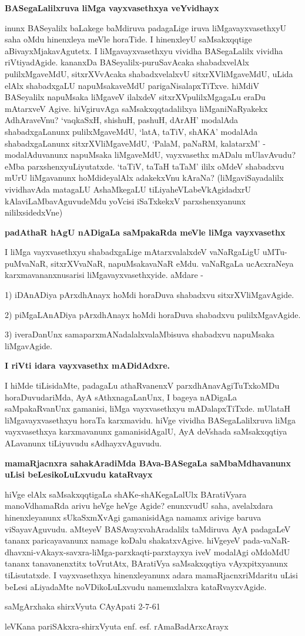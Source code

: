 \noindent
\textbf{BASegaLalilxruva liMga vayxvasethxya veYvidhayx}\label{page17}

inunx BASeyalilx baLakege baMdiruva padagaLige iruva liMgavayxvasethxyU saha oMdu hinenxleya meVle horaTide. I hinenxleyU saMsakxqqtige aBivayxMjakavAgutetx. I liMgavayxvasethxyu vividha BASegaLalilx vividha riVtiyadAgide. kananxDa BASeyalilx-puruSavAcaka shabadxvelAlx pulilxMgaveMdU, sitxrXVvAcaka shabadxvelalxvU sitxrXVliMgaveMdU, uLida elAlx shabadxgaLU napuMsakaveMdU parigaNisalapxTiTxve. hiMdiV BASeyalilx napuMsaka liMgaveV ilalxdeV sitxrXVpulilxMgagaLu eraDu mAtarxveV Agive. hiVgiruvAga saMsakxqqtadalilxya liMganiNaRyakekx AdhAraveVnu? `vaqkaSxH, shishuH, pashuH, dArAH' modalAda shabadxgaLanunx pulilxMgaveMdU, `latA, taTiV, shAKA' modalAda shabadxgaLanunx sitxrXVliMgaveMdU, `PalaM, paNaRM, kalatarxM' - modalAduvanunx napuMsaka liMgaveMdU, vayxvasethx mADalu mUlavAvudu? eMba parxshenxyuLiyutatxde. `taTiV, taTaH taTaM' ililx oMdeV shabadxvu mUrU liMgavanunx hoMdideyalAlx adakekxVnu kAraNa? (liMgaviSayadalilx vividhavAda matagaLU AshaMkegaLU tiLiyaheVLabeVkAgidadxrU kAlaviLaMbavAguvudeMdu yoVcisi iSaTxkekxV parxshenxyanunx nililxsidedxVne)

\noindent
\textbf{padAthaR hAgU nADigaLa saMpakaRda meVle liMga vayxvasethx}\label{page18}

I liMga vayxvasethxyu shabadxgaLige mAtarxvalalxdeV vaNaRgaLigU uMTu-puMvaNaR, sitxrXVvaNaR, napuMsakavaNaR eMdu. vaNaRgaLa ucAcxraNeya karxmavananxnusarisi liMgavayxvasethxyide. aMdare -

1) iDAnADiya pArxdhAnayx hoMdi horaDuva shabadxvu sitxrXVliMgavAgide.

2) piMgaLAnADiya pArxdhAnayx hoMdi horaDuva shabadxvu pulilxMgavAgide.

3) iveraDanUnx samaparxmANadalalxvalaMbisuva shabadxvu napuMsaka liMgavAgide.

\noindent
\textbf{I riVti idara vayxvasethx mADidAdxre.}

I hiMde tiLisidaMte, padagaLu athaRvanenxV parxdhAnavAgiTuTxkoMDu horaDuvudariMda, AyA sAthxnagaLanUnx, I bageya nADigaLa saMpakaRvanUnx gamanisi, liMga vayxvasethxyu mADalapxTiTxde. mUlataH liMgavayxvasethxyu horaTa karxmavidu. hiVge vividha BASegaLalilxruva liMga vayxvasethxya karxmavanunx gamanisidAgalU, AyA deVshada saMsakxqqtiya ALavanunx tiLiyuvudu sAdhayxvAguvudu.

\noindent
\textbf{mamaRjacnxra sahakAradiMda BAva-BASegaLa saMbaMdhavanunx uLisi beLesikoLuLxvudu kataRvayx}\label{page18}

hiVge elAlx saMsakxqqtigaLa shAKe-shAKegaLalUlx BAratiVyara manoVdhamaRda arivu heVge heVge Agide? enunxvudU saha, avelalxdara hinenxleyanunx sUkaSxmXvAgi gamanisidAga namamx arivige baruva viSayavAguvudu. aMteyeV BASAvayxvahAradalilx taMdiruva AyA padagaLeV tananx paricayavanunx namage koDalu shakatxvAgive. hiVgeyeV pada-vaNaR-dhavxni-vAkayx-savxra-liMga-parxkaqti-parxtayxya iveV modalAgi oMdoMdU tananx tanavanenxtitx toVrutAtx, BAratiVya saMsakxqqtiya vAyxpitxyanunx tiLisutatxde. I vayxvasethxya hinenxleyanunx adara mamaRjacnxriMdaritu uLisi beLesi aLiyadaMte noVDikoLuLxvudu namemxlalxra kataRvayxvAgide.

saMgArxhaka shirxVyuta CAyApati 2-7-61

leVKana pariSAkxra-shirxVyuta enf. esf. rAmaBadArxcArayx
